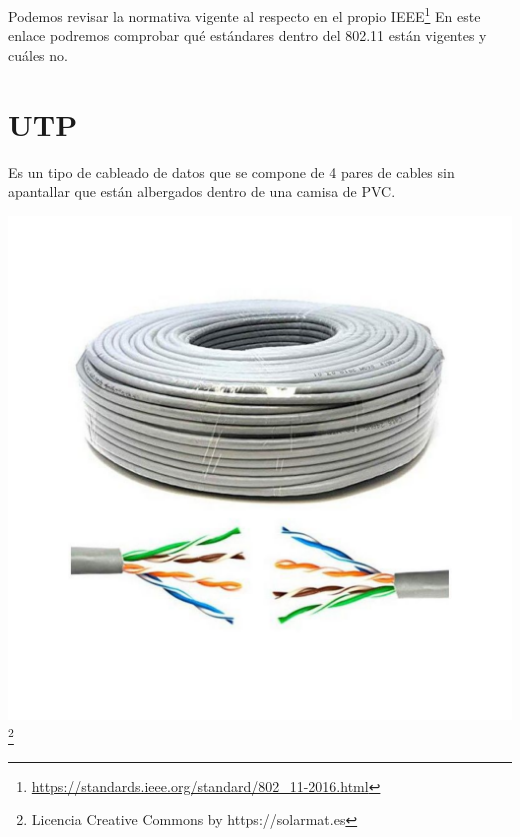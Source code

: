 Podemos revisar la normativa vigente al respecto en el propio IEEE\footnote{\url{https://standards.ieee.org/standard/802_11-2016.html}}
En este enlace podremos comprobar qué estándares dentro del 802.11 están vigentes y cuáles no.

\section{UTP}
Es un tipo de cableado de datos que se compone de 4 pares de cables sin apantallar que están albergados dentro de una camisa de PVC.

  \begin{center}
  \includegraphics[width=.6\textwidth]{img/bobina_UTP.pdf}\footnote{Licencia Creative Commons by https://solarmat.es}
  \end{center}

